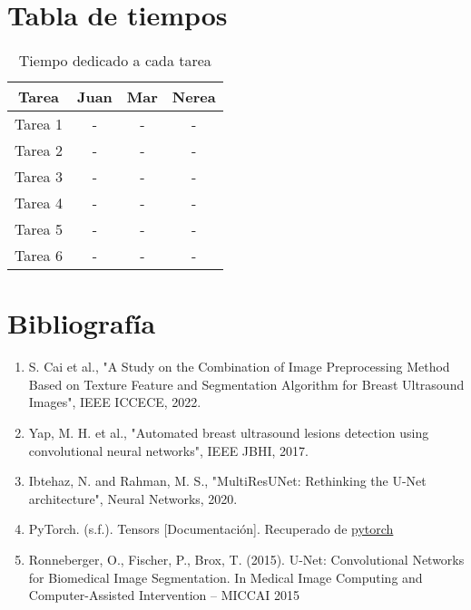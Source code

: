\documentclass[12pt]{article}
\begin{document}
\section{Tabla de tiempos}

\begin{table}[H]
\centering
\begin{tabular}{|c|c|c|c|}
\hline
\textbf{Tarea} & \textbf{Juan} & \textbf{Mar} & \textbf{Nerea} \\
\hline
Tarea 1 & - & - & - \\
Tarea 2 & - & - & - \\
Tarea 3 & - & - & - \\
Tarea 4 & - & - & - \\
Tarea 5 & - & - & - \\
Tarea 6 & - & - & - \\
\hline
\end{tabular}
\caption{Tiempo dedicado a cada tarea}
\end{table}

\section*{Bibliografía}
\begin{enumerate}
    \item S. Cai et al., "A Study on the Combination of Image Preprocessing Method Based on Texture Feature and Segmentation Algorithm for Breast Ultrasound Images", IEEE ICCECE, 2022.
    \item Yap, M. H. et al., "Automated breast ultrasound lesions detection using convolutional neural networks", IEEE JBHI, 2017.
    \item Ibtehaz, N. and Rahman, M. S., "MultiResUNet: Rethinking the U-Net architecture", Neural Networks, 2020.
    \item PyTorch. (s.f.). Tensors [Documentación]. Recuperado de \href{https://pytorch.org/docs/stable/tensors.html}{pytorch}
    \item Ronneberger, O., Fischer, P.,  Brox, T. (2015). U-Net: Convolutional Networks for Biomedical Image Segmentation. In Medical Image Computing and Computer-Assisted Intervention – MICCAI 2015
\end{enumerate}
\end{document}
